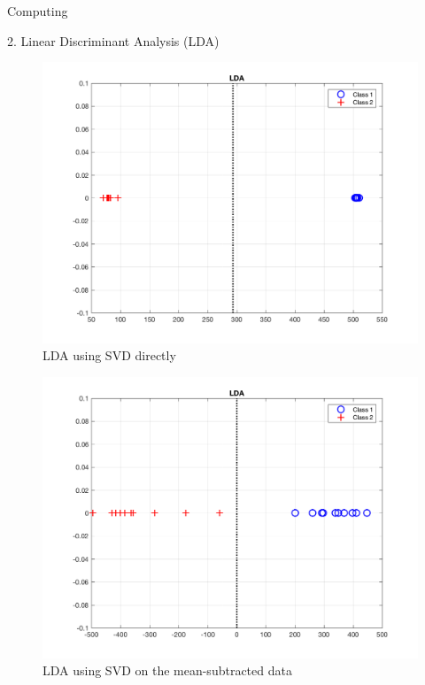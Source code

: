 \begin{section}{Computing}
\begin{homeworkSection}{2. Linear Discriminant Analysis (LDA)}
{\begin{minipage}{1.0\textwidth}
        \begin{figure}[H]
        \centering
        \includegraphics[trim={0cm 1cm 0cm 0cm},clip,width=0.60\columnwidth]{../data/classify}
        \caption{LDA using SVD directly}
        \label{fig:lda_1}
        \end{figure}
    \end{minipage}
    \begin{minipage}{1.0\textwidth}
        \begin{figure}[H]
        \centering
        \includegraphics[trim={0cm 1cm 0cm 0cm},clip,width=0.60\columnwidth]{../data/classify_KL}
        \caption{LDA using SVD on the mean-subtracted data}
        \label{fig:lda_2}
        \end{figure}
    \end{minipage}
}

\end{homeworkSection}


\end{section}
